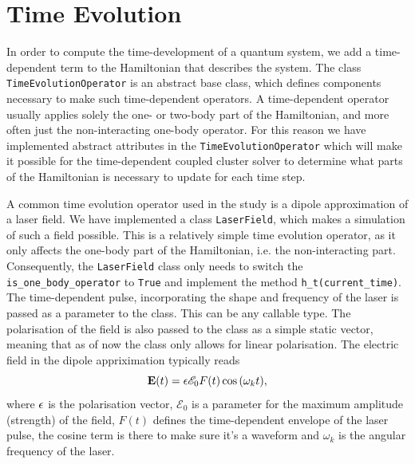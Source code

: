 

\section{Time Evolution}

In order to compute the time-development of a quantum system, we add a
time-dependent term to the Hamiltonian that describes the system. The class 
\lstinline{TimeEvolutionOperator} is an abstract base class, which defines
components necessary to make such time-dependent operators. A time-dependent 
operator usually applies solely the one- or two-body part of the Hamiltonian, and 
more often just the non-interacting one-body operator. For this reason we have implemented 
abstract attributes in the \lstinline{TimeEvolutionOperator} which will make it 
possible for the time-dependent coupled cluster solver to determine what parts 
of the Hamiltonian is necessary to update for each time step.



A common time evolution operator used in the study is a dipole approximation of 
a laser field. We have implemented a class \lstinline{LaserField}, which makes 
a simulation of such a field possible. This is a relatively simple time evolution 
operator, as it only affects the one-body part of the Hamiltonian, i.e. the 
non-interacting part. Consequently, the \lstinline{LaserField} class only needs 
to switch the \lstinline{is_one_body_operator} to \lstinline{True} and implement 
the method \lstinline{h_t(current_time)}. The time-dependent pulse, incorporating the 
shape and frequency of the laser is passed as a parameter to the class. This can be 
any callable type. The polarisation of the field is also passed to the class 
as a simple static vector, meaning that as of now the class only allows for 
linear polarisation. The electric field in the dipole appriximation typically 
reads
\begin{equation}
    \vb{E}(t) = \vb{\epsilon} \mathscr{E}_0 F(t)\cos{(\omega_k t)},
\end{equation}
where $\vb{\epsilon}$ is the polarisation vector, $\mathscr{E}_0$ is a parameter 
for the maximum amplitude (strength) of the field, $F(t)$ defines the time-dependent 
envelope of the laser pulse, the cosine term is there to make sure it's a waveform and
$\omega_k$ is the angular frequency of the laser.

